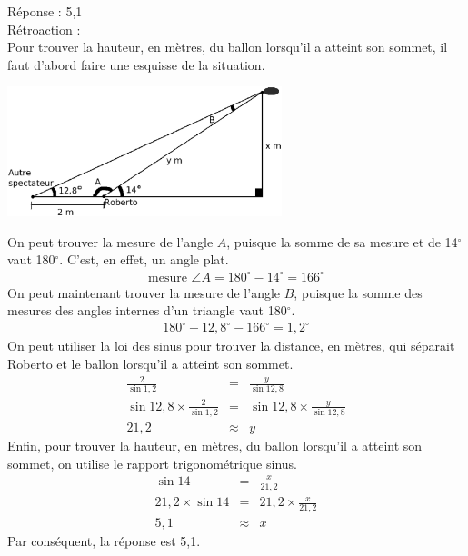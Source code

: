 \documentclass[letterpaper, 12pt]{article}
\begin{document}
R\'eponse : 5,1\\

R\'etroaction :\\
Pour trouver la hauteur, en m\`etres, du ballon lorsqu'il a atteint son sommet, il faut d'abord faire une esquisse de la situation.
\begin{center}
 \includegraphics[width=8cm,bb=0 408 689 842]{Q2409.eps}
\end{center}
On peut trouver la mesure de l'angle $A$, puisque la somme de sa mesure et de 14$^{\circ}$ vaut 180$^{\circ}$. C'est, en effet, un angle plat.
\begin{eqnarray*}
\textrm{mesure }\angle{A} = 180^{\circ}-14^{\circ} = 166 ^{\circ}
\end{eqnarray*}
On peut maintenant trouver la mesure de l'angle $B$, puisque la somme des mesures des angles internes d'un triangle vaut 180$^{\circ}$.
\begin{eqnarray*}
 180^{\circ}-12,8^{\circ}-166^{\circ}=1,2^{\circ}
\end{eqnarray*}
On peut utiliser la loi des sinus pour trouver la distance, en m\`etres,  qui s\'eparait Roberto et le ballon lorsqu'il a atteint son sommet.
\begin{eqnarray*}
 \frac{2}{\sin{1,2}}&=& \frac{y}{\sin{12,8}}\\[2mm]
 \sin{12,8} \times \frac{2}{\sin{1,2}}&=&  \sin{12,8} \times \frac{y}{\sin{12,8}}\\[2mm]
 21,2&\approx&  y
\end{eqnarray*}
Enfin, pour trouver la hauteur, en m\`etres, du ballon lorsqu'il a atteint son sommet, on utilise le rapport trigonom\'etrique sinus.
\begin{eqnarray*}
 \sin{14} &=& \frac{x}{21,2}\\[2mm]
21,2 \times \sin{14} &=& 21,2 \times\frac{x}{21,2}\\[2mm]
5,1 &\approx& x
\end{eqnarray*}
Par cons\'equent, la r\'eponse est 5,1.\\
\end{document}
